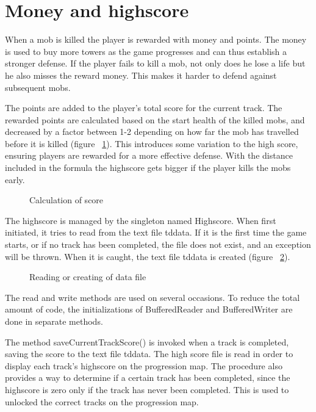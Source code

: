 \section{Money and highscore}

When a mob is killed the player is rewarded with money and points. The money is used to buy more towers as the game progresses and can thus establish a stronger defense. If the player fails to kill a mob, not only does he lose a life but he also misses the reward money. This makes it harder to defend against subsequent mobs.

The points are added to the player's total score for the current track. The rewarded points are calculated based on the start health of the killed mobs, and decreased by a factor between 1-2 depending on how far the mob has travelled before it is killed (figure ~\ref{fig:codeExChangeScore}). This introduces some variation to the high score, ensuring players are rewarded for a more effective defense. With the distance included in the formula the highscore gets bigger if the player kills the mobs early.

\begin{figure}[htb]
\begin{small}

\end{small}
\caption{Calculation of score}
\label{fig:codeExChangeScore}
\end{figure}

The highscore is managed by the singleton named Highscore. When first initiated, it tries to read from the text file tddata. If it is the first time the game starts, or if no track has been completed, the file does not exist, and an exception will be thrown. When it is caught, the text file tddata is created (figure ~\ref{fig:codeExReadCreateFile}).

\begin{figure}[htb]
\begin{small}

\end{small}
\caption{Reading or creating of data file}
\label{fig:codeExReadCreateFile}
\end{figure}

The read and write methods are used on several occasions. To reduce the total amount of code, the initializations of BufferedReader and BufferedWriter are done in separate methods.

The method saveCurrentTrackScore() is invoked when a track is completed, saving the score to the text file tddata. The high score file is read in order to display each track's highscore on the progression map. The procedure also provides a way to determine if a certain track has been completed, since the highscore is zero only if the track has never been completed. This is used to unlocked the correct tracks on the progression map.